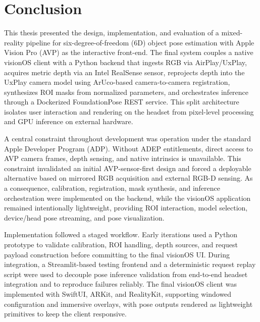 \section{Conclusion}

This thesis presented the design, implementation, and evaluation of a mixed-reality pipeline for six-degree-of-freedom (6D) object pose estimation with Apple Vision Pro (AVP) as the interactive front-end. The final system couples a native visionOS client with a Python backend that ingests RGB via AirPlay/UxPlay, acquires metric depth via an Intel RealSense sensor, reprojects depth into the UxPlay camera model using ArUco-based camera-to-camera registration, synthesizes ROI masks from normalized parameters, and orchestrates inference through a Dockerized FoundationPose REST service. This split architecture isolates user interaction and rendering on the headset from pixel-level processing and GPU inference on external hardware.

A central constraint throughout development was operation under the standard Apple Developer Program (ADP). Without ADEP entitlements, direct access to AVP camera frames, depth sensing, and native intrinsics is unavailable. This constraint invalidated an initial AVP-sensor-first design and forced a deployable alternative based on mirrored RGB acquisition and external RGB-D sensing. As a consequence, calibration, registration, mask synthesis, and inference orchestration were implemented on the backend, while the visionOS application remained intentionally lightweight, providing ROI interaction, model selection, device/head pose streaming, and pose visualization.

Implementation followed a staged workflow. Early iterations used a Python prototype to validate calibration, ROI handling, depth sources, and request payload construction before committing to the final visionOS UI. During integration, a Streamlit-based testing frontend and a deterministic request replay script were used to decouple pose inference validation from end-to-end headset integration and to reproduce failures reliably. The final visionOS client was implemented with SwiftUI, ARKit, and RealityKit, supporting windowed configuration and immersive overlays, with pose outputs rendered as lightweight primitives to keep the client responsive.

